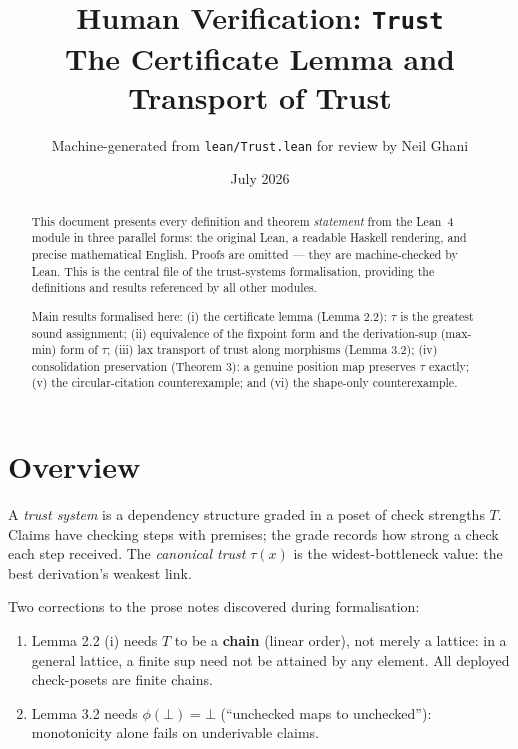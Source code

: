 \documentclass[11pt,a4paper]{article}
\title{Human Verification: \texttt{Trust}\\[4pt]
  \large The Certificate Lemma and Transport of Trust}
\author{Machine-generated from \texttt{lean/Trust.lean} for review by Neil Ghani}
\date{July 2026}
\begin{document}
\maketitle

\begin{abstract}
This document presents every definition and theorem \emph{statement} from the
Lean~4 module  in three parallel forms: the original
Lean, a readable Haskell rendering, and precise mathematical English.  Proofs
are omitted --- they are machine-checked by Lean.  This is the central file
of the trust-systems formalisation, providing the definitions and results
referenced by all other modules.

Main results formalised here: (i) the certificate lemma (Lemma 2.2): $\tau$
is the greatest sound assignment; (ii) equivalence of the fixpoint form and
the derivation-sup (max-min) form of $\tau$; (iii) lax transport of trust
along morphisms (Lemma 3.2); (iv) consolidation preservation (Theorem 3):
a genuine position map preserves $\tau$ exactly; (v) the circular-citation
counterexample; and (vi) the shape-only counterexample.
\end{abstract}

\tableofcontents
\bigskip

\section{Overview}

A \emph{trust system} is a dependency structure graded in a poset of check
strengths $T$.  Claims have checking steps with premises; the grade records
how strong a check each step received.  The \emph{canonical trust} $\tau(x)$
is the widest-bottleneck value: the best derivation's weakest link.

Two corrections to the prose notes discovered during formalisation:

\begin{enumerate}
\item Lemma 2.2 (i) needs $T$ to be a \textbf{chain} (linear order), not
  merely a lattice: in a general lattice, a finite sup need not be attained
  by any element.  All deployed check-posets are finite chains.
\item Lemma 3.2 needs $\phi(\bot) = \bot$ (``unchecked maps to unchecked''):
  monotonicity alone fails on underivable claims.
\end{enumerate}
\end{document}
